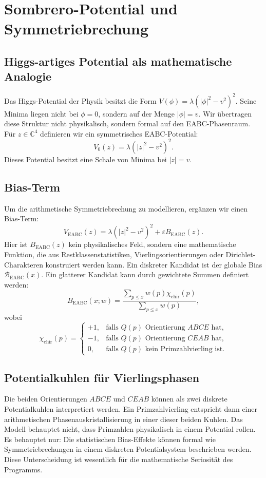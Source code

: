 \documentclass[11pt,a4paper,bibliography=totoc]{scrartcl}
\begin{document}
\section{Sombrero-Potential und Symmetriebrechung}

\subsection{Higgs-artiges Potential als mathematische Analogie}
Das Higgs-Potential der Physik besitzt die Form $V(\phi) = \lambda \left(|\phi|^2 - v^2\right)^2$. Seine Minima liegen nicht bei $\phi = 0$, sondern auf der Menge $|\phi| = v$. Wir übertragen diese Struktur nicht physikalisch, sondern formal auf den EABC-Phasenraum. Für $z \in \mathbb{C}^4$ definieren wir ein symmetrisches EABC-Potential:
\[
V_0(z) = \lambda \left(|z|^2 - v^2\right)^2.
\]
Dieses Potential besitzt eine Schale von Minima bei $|z| = v$.

\subsection{Bias-Term}
Um die arithmetische Symmetriebrechung zu modellieren, ergänzen wir einen Bias-Term:
\[
V_{\mathrm{EABC}}(z) = \lambda \left(|z|^2 - v^2\right)^2 + \varepsilon B_{\mathrm{EABC}}(z).
\]
Hier ist $B_{\mathrm{EABC}}(z)$ kein physikalisches Feld, sondern eine mathematische Funktion, die aus Restklassenstatistiken, Vierlingsorientierungen oder Dirichlet-Charakteren konstruiert werden kann. Ein diskreter Kandidat ist der globale Bias $\mathcal{B}_{\mathrm{EABC}}(x)$. Ein glatterer Kandidat kann durch gewichtete Summen definiert werden:
\[
B_{\mathrm{EABC}}(x; w) = \frac{\sum_{p \leq x} w(p)\chi_{\mathrm{chir}}(p)}{\sum_{p \leq x} w(p)},
\]
wobei
\[
\chi_{\mathrm{chir}}(p) = 
\begin{cases}
+1, & \text{falls } Q(p) \text{ Orientierung } ABCE \text{ hat}, \\
-1, & \text{falls } Q(p) \text{ Orientierung } CEAB \text{ hat}, \\
0,  & \text{falls } Q(p) \text{ kein Primzahlvierling ist}.
\end{cases}
\]

\subsection{Potentialkuhlen für Vierlingsphasen}
Die beiden Orientierungen $ABCE$ und $CEAB$ können als zwei diskrete Potentialkuhlen interpretiert werden. Ein Primzahlvierling entspricht dann einer arithmetischen Phasenauskristallisierung in einer dieser beiden Kuhlen. Das Modell behauptet nicht, dass Primzahlen physikalisch in einem Potential rollen. Es behauptet nur: Die statistischen Bias-Effekte können formal wie Symmetriebrechungen in einem diskreten Potentialsystem beschrieben werden. Diese Unterscheidung ist wesentlich für die mathematische Seriosität des Programms.
\end{document}
